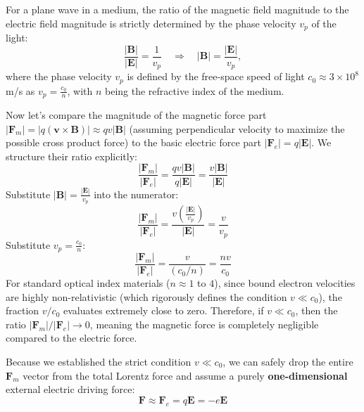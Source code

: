 \begin{keyinsight}
    For a plane wave in a medium, the ratio of the magnetic field magnitude to the electric field magnitude is strictly determined by the phase velocity $v_p$ of the light:
    \begin{equation*}
        \frac{|\bm{B}|}{|\bm{E}|} = \frac{1}{v_p} \quad \Rightarrow \quad |\bm{B}| = \frac{|\bm{E}|}{v_p},
    \end{equation*}
    where the phase velocity $v_p$ is defined by the free-space speed of light $c_0 \approx 3 \times 10^8$ m/s as $v_p = \frac{c_0}{n}$, with $n$ being the refractive index of the medium.

    Now let's compare the magnitude of the magnetic force part $|\bm{F}_m| = |q(\bm{v}\times\bm{B})| \approx q v |\bm{B}|$ (assuming perpendicular velocity to maximize the possible cross product force) to the basic electric force part $|\bm{F}_e| = q |\bm{E}|$. We structure their ratio explicitly:
    \begin{equation*}
        \frac{|\bm{F}_m|}{|\bm{F}_e|} = \frac{q v |\bm{B}|}{q |\bm{E}|} = \frac{v |\bm{B}|}{|\bm{E}|}
    \end{equation*}
    Substitute $|\bm{B}| = \frac{|\bm{E}|}{v_p}$ into the numerator:
    \begin{equation*}
        \frac{|\bm{F}_m|}{|\bm{F}_e|} = \frac{v \left(\frac{|\bm{E}|}{v_p}\right)}{|\bm{E}|} = \frac{v}{v_p}
    \end{equation*}
    Substitute $v_p = \frac{c_0}{n}$:
    \begin{equation*}
        \frac{|\bm{F}_m|}{|\bm{F}_e|} = \frac{v}{(c_0/n)} = \frac{n v}{c_0}
    \end{equation*}
    For standard optical index materials ($n \approx 1$ to $4$), since bound electron velocities are highly non-relativistic (which rigorously defines the condition $v \ll c_0$), the fraction $v/c_0$ evaluates extremely close to zero. Therefore, if $v \ll c_0$, then the ratio $|\bm{F}_m|/|\bm{F}_e| \to 0$, meaning the magnetic force is completely negligible compared to the electric force.
\end{keyinsight}

Because we established the strict condition $v \ll c_0$, we can safely drop the entire $\bm{F}_m$ vector from the total Lorentz force and assume a purely \textbf{one-dimensional} external electric driving force:
\begin{equation*}
    \bm{F}\approx \bm{F}_e = q\bm{E} = -e\bm{E}
\end{equation*}

